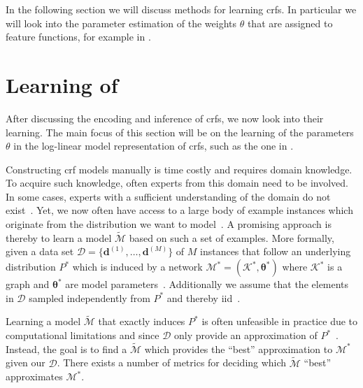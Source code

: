 \bigskip

In the following section we will discuss methods for learning \glspl{crf}.
In particular we will look into the parameter estimation of the weights $\theta$ that are assigned to \glspl{feature function}, for example in .

\section{Learning of }\label{sec:learning-crfs}

After discussing the encoding and inference of \glspl{crf}, we now look into their learning.
The main focus of this section will be on the learning of the parameters $\theta$ in the \gls{log-linear model} representation of \glspl{crf}, such as the one in .

\bigskip

Constructing \gls{crf} models manually is time costly and requires domain knowledge.
To acquire such knowledge, often experts from this domain need to be involved.
In some cases, experts with a sufficient understanding of the domain do not exist~\citep{koller2009probabilistic}.
Yet, we now often have access to a large body of example instances which originate from the distribution we want to model~\citep{koller2009probabilistic}.
A promising approach is thereby to learn a model $\mathcal{\tilde{M}}$ based on such a set of examples.
More formally, given a data set $\mathcal{D}=\{\bm{d}^{(1)},\dots,\bm{d}^{(M)}\}$ of $M$ instances that follow an underlying distribution $P^*$ which is induced by a network $\mathcal{M}^*=(\mathcal{K}^*,\bm{\theta}^*)$ where $\mathcal{K}^*$ is a graph and $\bm{\theta}^*$ are model parameters~\citep{koller2009probabilistic}.
Additionally we assume that the elements in $\mathcal{D}$ sampled independently from $P^*$ and thereby \acrfull{iid}~\citep{koller2009probabilistic}.

\bigskip

Learning a model $\mathcal{\tilde{M}}$ that exactly induces $P^*$ is often unfeasible in practice due to computational limitations and since $\mathcal{D}$ only provide an approximation of $P^*$~\citep{koller2009probabilistic}.
Instead, the goal is to find a $\mathcal{\tilde{M}}$ which provides the ``best'' approximation to $\mathcal{M}^*$ given our $\mathcal{D}$.
There exists a number of metrics for deciding which $\mathcal{\tilde{M}}$ ``best'' approximates $\mathcal{M}^*$.

